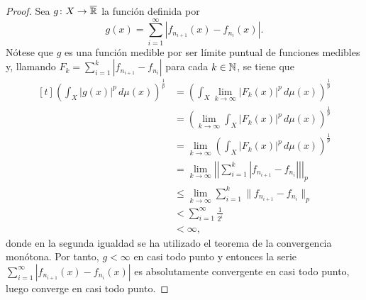 \documentclass[a4paper, 11pt, oneside]{report}
\begin{document}
\begin{proof}
  Sea $g \colon X \to \overline{\mathbb R}$ la función definida por \[g(x)= \sum_{i=1}^\infty |f_{n_{i+1}}(x)-f_{n_i}(x)|.\] Nótese que $g$ es una función medible por ser límite puntual de funciones medibles y, llamando $F_k=\sum_{i=1}^k |f_{n_{i+1}}-f_{n_i}|$ para cada $k \in \mathbb N$, se tiene que
  \[
  \begin{aligned}[t]
    \left(\int_X|g(x)|^p \, d\mu(x)\right)^{\frac{1}{p}} &= \left(\int_X \lim_{k \to \infty} |F_k(x)|^p \, d\mu(x)\right)^{\frac{1}{p}} \\ &= \left(\lim_{k \to \infty} \int_X |F_k(x)|^p \, d\mu(x)\right)^{\frac{1}{p}} \\ 
    &= \lim_{k \to \infty} \left(\int_X|F_k(x)|^p \, d\mu(x)\right)^{\frac{1}{p}} \\ &= \lim_{k \to \infty} \left|\left|\sum_{i=1}^k |f_{n_{i+1}}-f_{n_i}|\right|\right|_p \\ 
    &\leq \lim_{k \to \infty} \sum_{i=1}^k \|f_{n_{i+1}}-f_{n_i}\|_p \\
    &< \sum_{i=1}^\infty \frac{1}{2^i} \\
    &<\infty,
  \end{aligned}
  \]
  donde en la segunda igualdad se ha utilizado el teorema de la convergencia monótona. Por tanto, $g < \infty$ en casi todo punto y entonces la serie $\sum_{i=1}^\infty |f_{n_{i+1}}(x)-f_{n_i}(x)|$ es absolutamente convergente en casi todo punto, luego converge en casi todo punto.


\end{proof}
\end{document}
